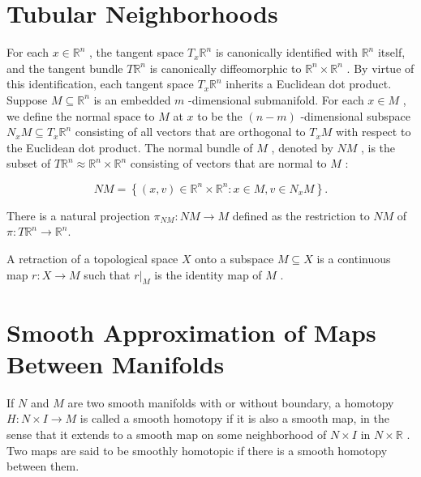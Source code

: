 \section{Tubular Neighborhoods}

\begin{definition}
\label{def:6-42-extra-1}
\leanok
For each $x \in  {\mathbb{R}}^{n}$ , the tangent space ${T}_{x}{\mathbb{R}}^{n}$ is canonically identified with ${\mathbb{R}}^{n}$ itself, and the tangent bundle $T{\mathbb{R}}^{n}$ is canonically diffeomorphic to ${\mathbb{R}}^{n} \times  {\mathbb{R}}^{n}$ . By virtue of this identification, each tangent space ${T}_{x}{\mathbb{R}}^{n}$ inherits a Euclidean dot product. Suppose $M \subseteq  {\mathbb{R}}^{n}$ is an embedded $m$ -dimensional submanifold. For each $x \in  M$ , we define the normal space to $M$ at $x$ to be the $\left( {n - m}\right)$ -dimensional subspace ${N}_{x}M \subseteq  {T}_{x}{\mathbb{R}}^{n}$ consisting of all vectors that are orthogonal to ${T}_{x}M$ with respect to the Euclidean dot product. The normal bundle of $M$ , denoted by ${NM}$ , is the subset of $T{\mathbb{R}}^{n} \approx  {\mathbb{R}}^{n} \times  {\mathbb{R}}^{n}$ consisting of vectors that are normal to $M$ :

\[
{NM} = \left\{  {\left( {x, v}\right)  \in  {\mathbb{R}}^{n} \times  {\mathbb{R}}^{n} : x \in  M, v \in  {N}_{x}M}\right\}  .
\]

There is a natural projection ${\pi }_{NM} : {NM} \rightarrow  M$ defined as the restriction to ${NM}$ of $\pi  : T{\mathbb{R}}^{n} \rightarrow  {\mathbb{R}}^{n}.$
\end{definition}

\begin{definition}
\label{def:6-42-extra-3}
\leanok
A retraction of a topological space $X$ onto a subspace $M \subseteq  X$ is a continuous map $r : X \rightarrow  M$ such that ${\left. r\right| }_{M}$ is the identity map of $M$ .
\end{definition}


\section{Smooth Approximation of Maps Between Manifolds}

\begin{definition}
\label{def:6-43-extra-1}
\leanok
If $N$ and $M$ are two smooth manifolds with or without boundary, a homotopy $H : N \times  I \rightarrow  M$ is called a smooth homotopy if it is also a smooth map, in the sense that it extends to a smooth map on some neighborhood of $N \times  I$ in $N \times  \mathbb{R}$ . Two maps are said to be smoothly homotopic if there is a smooth homotopy between them.
\end{definition}

